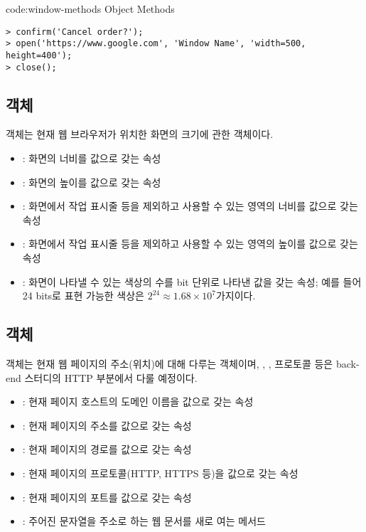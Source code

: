 \begin{codeenv}{code:window-methods}{ Object Methods}\begin{verbatim}
> confirm('Cancel order?');
> open('https://www.google.com', 'Window Name', 'width=500, height=400');
> close();
\end{verbatim}
\end{codeenv}
\newpage

\subsection*{ 객체}

 객체는 현재 웹 브라우저가 위치한 화면의 크기에 관한 객체이다.

\begin{itemize}
    \item {}: 화면의 너비를 값으로 갖는 속성
    \item {}: 화면의 높이를 값으로 갖는 속성
    \item {}: 화면에서 작업 표시줄 등을 제외하고 사용할 수 있는 영역의 너비를 값으로 갖는 속성
    \item {}: 화면에서 작업 표시줄 등을 제외하고 사용할 수 있는 영역의 높이를 값으로 갖는 속성
    \item {}: 화면이 나타낼 수 있는 색상의 수를 bit 단위로 나타낸 값을 갖는 속성; 예를 들어 24 bits로 표현 가능한 색상은 $2^{24} \approx 1.68 \times 10^7$가지이다.
\end{itemize}

\subsection*{ 객체}

 객체는 현재 웹 페이지의 주소(위치)에 대해 다루는 객체이며, , , 프로토콜 등은 back-end 스터디의 HTTP 부분에서 다룰 예정이다.

\begin{itemize}
    \item {}: 현재 페이지 호스트의 도메인 이름을 값으로 갖는 속성
    \item {}: 현재 페이지의 주소를 값으로 갖는 속성
    \item {}: 현재 페이지의 경로를 값으로 갖는 속성
    \item {}: 현재 페이지의 프로토콜(HTTP, HTTPS 등)을 값으로 갖는 속성
    \item {}: 현재 페이지의 포트를 값으로 갖는 속성
    \item {}: 주어진 문자열을 주소로 하는 웹 문서를 새로 여는 메서드
\end{itemize}

